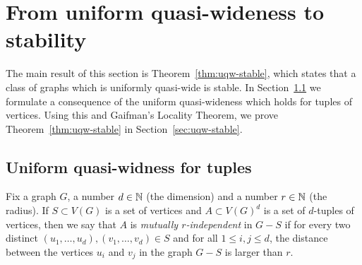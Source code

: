 
\section{From uniform quasi-wideness to stability}\label{sec:stable}
The main result of this section is Theorem~\ref{thm:uqw-stable},
which states 
that a class of graphs which is uniformly quasi-wide is stable.
In Section~\ref{sec:uqw-tuples} we formulate a consequence of the uniform quasi-wideness which
holds for tuples of vertices. Using this and  Gaifman's Locality Theorem, we prove Theorem~\ref{thm:uqw-stable} in Section~\ref{sec:uqw-stable}.


\subsection{Uniform quasi-widness for tuples}\label{sec:uqw-tuples}
Fix a graph $G$, a number $d\in\mathbb{N}$ (the dimension) and a number $r\in \mathbb{N}$ (the radius).
If $S\subset V(G)$ is a set of vertices and $A\subset V(G)^d$ is a set of $d$-tuples of vertices,
then we say that $A$ is \emph{mutually $r$-independent} in $G-S$ 
if for every two distinct $(u_1,\ldots,u_d),(v_1,\ldots,v_d)\in S$
and for all $1\le i,j\le d$, the distance between the vertices $u_i$ and $v_j$ in the graph $G-S$
is larger than $r$.


